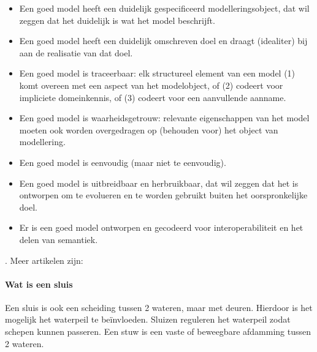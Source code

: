 \documentclass{article}
\begin{document}
	
	\begin{itemize}
		\item Een goed model heeft een duidelijk gespecificeerd modelleringsobject, dat wil zeggen dat het duidelijk is wat het model beschrijft.  %
		\item Een goed model heeft een duidelijk omschreven doel en draagt (idealiter) bij aan de realisatie van dat doel. %
		\item Een goed model is traceerbaar: elk structureel element van een model (1) komt overeen met een aspect van het modelobject, of (2) codeert voor impliciete domeinkennis, of (3) codeert voor een aanvullende aanname. %
		\item Een goed model is waarheidsgetrouw: relevante eigenschappen van het model moeten ook worden overgedragen op (behouden voor) het object van modellering. %
		\item Een goed model is eenvoudig (maar niet te eenvoudig). %
		\item Een goed model is uitbreidbaar en herbruikbaar, dat wil zeggen dat het is ontworpen om te evolueren en te worden gebruikt buiten het oorspronkelijke doel. %
		\item Er is een goed model ontworpen en gecodeerd voor interoperabiliteit en het delen van semantiek. %
	\end{itemize}
	
	
	\cite{fvaandrager2322010Goodmodel}. Meer artikelen zijn: 
	\cite{onix01102022devopmodel}
	\cite{sulemani04012021softwareprocesmodel}
	\cite{globalluxsoft18102017softdev}
	\cite{wiegers30052022SRS}
	\cite{muller06092020goodspecification}
	\cite{informit30062008reqmanagement}
	\cite{altexsoft15092020writingSRS}
	
	
	\paragraph{Wat is een sluis}
	Een sluis is ook een scheiding tussen 2 wateren, maar met deuren. Hierdoor is het mogelijk het waterpeil te beïnvloeden. Sluizen reguleren het waterpeil zodat schepen kunnen passeren. Een stuw is een vaste of beweegbare afdamming tussen 2 wateren. \cite{rijkSluisdef}
	
\end{document}
